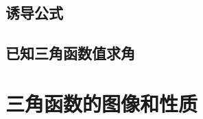 \subsection{诱导公式}
\begin{Practice}
  \begin{question}
    \item 
    \item 
    \item 
    \item 
  \end{question}
\end{Practice}

\begin{Practice}
  \begin{question}
    \item 
    \item 
    \item 
    \item 
  \end{question}
\end{Practice}

\subsection{已知三角函数值求角}
\begin{Practice}
  \begin{question}
    \item 
    \item 
    \item 
  \end{question}
\end{Practice}

\begin{Exercise}
  \begin{question}
    \item 
    \item 
    \item 
    \item 
    \item 
    \item 
    \item 
    \item 
    \item 
    \item 
  \end{question}
\end{Exercise}

\section{三角函数的图像和性质}
